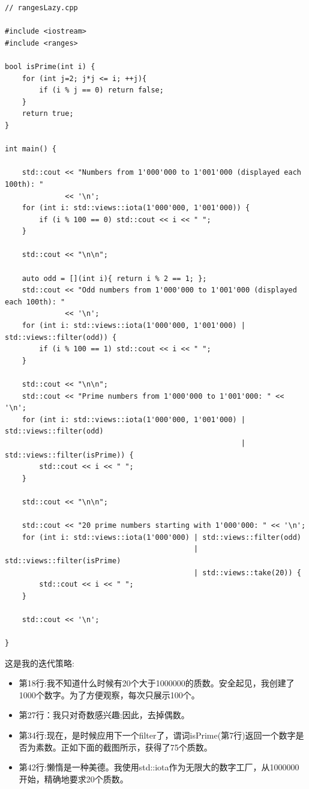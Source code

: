 \begin{lstlisting}[style=styleCXX]
// rangesLazy.cpp

#include <iostream>
#include <ranges>

bool isPrime(int i) {
	for (int j=2; j*j <= i; ++j){
		if (i % j == 0) return false;
	}
	return true;
}

int main() {
	
	std::cout << "Numbers from 1'000'000 to 1'001'000 (displayed each 100th): "
	          << '\n';
	for (int i: std::views::iota(1'000'000, 1'001'000)) {
		if (i % 100 == 0) std::cout << i << " ";
	}
	
	std::cout << "\n\n";
	
	auto odd = [](int i){ return i % 2 == 1; };
	std::cout << "Odd numbers from 1'000'000 to 1'001'000 (displayed each 100th): "
	          << '\n';
	for (int i: std::views::iota(1'000'000, 1'001'000) | std::views::filter(odd)) {
		if (i % 100 == 1) std::cout << i << " ";
	}
	
	std::cout << "\n\n";
	std::cout << "Prime numbers from 1'000'000 to 1'001'000: " << '\n';
	for (int i: std::views::iota(1'000'000, 1'001'000) | std::views::filter(odd)
	                                                   | std::views::filter(isPrime)) {
		std::cout << i << " ";
	}
	
	std::cout << "\n\n";
	
	std::cout << "20 prime numbers starting with 1'000'000: " << '\n';
	for (int i: std::views::iota(1'000'000) | std::views::filter(odd)
	                                        | std::views::filter(isPrime)
	                                        | std::views::take(20)) {
		std::cout << i << " ";
	}
	
	std::cout << '\n';

}
\end{lstlisting}

这是我的迭代策略:

\begin{itemize}
\item 
第18行:我不知道什么时候有20个大于1000000的质数。安全起见，我创建了1000个数字。为了方便观察，每次只展示100个。

\item 
第27行：我只对奇数感兴趣;因此，去掉偶数。

\item 
第34行:现在，是时候应用下一个filter了，谓词isPrime(第7行)返回一个数字是否为素数。正如下面的截图所示，获得了75个质数。

\item 
第42行:懒惰是一种美德。我使用std::iota作为无限大的数字工厂，从1000000开始，精确地要求20个质数。
\end{itemize}

